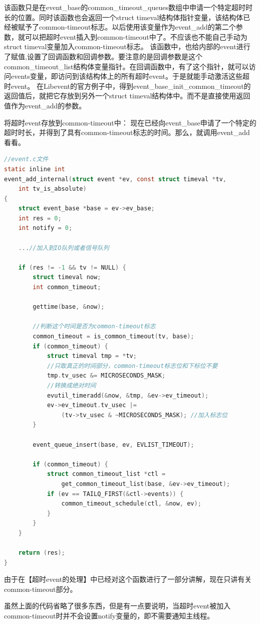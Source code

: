 \documentclass[11pt,a4paper]{article}
\begin{document}
该函数只是在event\_base的common\_timeout\_queues数组中申请一个特定超时时长的位置。同时该函数也会返回一个struct timeval结构体指针变量，该结构体已经被赋予了common-timeout标志。以后使用该变量作为event\_add的第二个参数，就可以把超时event插入到common-timeout中了。不应该也不能自己手动为struct timeval变量加入common-timeout标志。
        该函数中，也给内部的event进行了赋值,设置了回调函数和回调参数。要注意的是回调参数是这个common\_timeout\_list结构体变量指针。在回调函数中，有了这个指针，就可以访问events变量，即访问到该结构体上的所有超时event。于是就能手动激活这些超时event。
        在Libevent的官方例子中，得到event\_base\_init\_common\_timeout的返回值后，就把它存放到另外一个struct timeval结构体中。而不是直接使用返回值作为event\_add的参数。
        
将超时event存放到common-timeout中：
        现在已经向event\_base申请了一个特定的超时时长，并得到了具有common-timeout标志的时间。那么，就调用event\_add看看。

\begin{lstlisting}[language=C]
//event.c文件
static inline int
event_add_internal(struct event *ev, const struct timeval *tv,
    int tv_is_absolute)
{
	struct event_base *base = ev->ev_base;
	int res = 0;
	int notify = 0;

	...//加入到IO队列或者信号队列

	if (res != -1 && tv != NULL) {
		struct timeval now;
		int common_timeout;

		gettime(base, &now);

		//判断这个时间是否为common-timeout标志
		common_timeout = is_common_timeout(tv, base);
	    if (common_timeout) {
			struct timeval tmp = *tv;
			//只取真正的时间部分，common-timeout标志位和下标位不要
			tmp.tv_usec &= MICROSECONDS_MASK;
			//转换成绝对时间
			evutil_timeradd(&now, &tmp, &ev->ev_timeout);
			ev->ev_timeout.tv_usec |=
			    (tv->tv_usec & ~MICROSECONDS_MASK); //加入标志位
		}
	
		event_queue_insert(base, ev, EVLIST_TIMEOUT);
		
		if (common_timeout) {
			struct common_timeout_list *ctl =
			    get_common_timeout_list(base, &ev->ev_timeout);
			if (ev == TAILQ_FIRST(&ctl->events)) {
				common_timeout_schedule(ctl, &now, ev);
			}
		}
	}

	return (res);
}
\end{lstlisting}
由于在【超时event的处理】中已经对这个函数进行了一部分讲解，现在只讲有关common-timeout部分。
 
虽然上面的代码省略了很多东西，但是有一点要说明，当超时event被加入common-timeout时并不会设置notify变量的，即不需要通知主线程。
        
\end{document}
